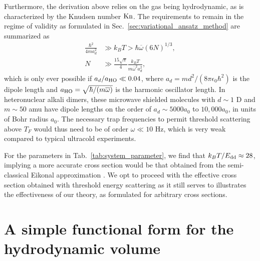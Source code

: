 \documentclass[reprint, amsmath, amssymb, aps, superscriptaddress]{revtex4-1}
\begin{document}
Furthermore, the derivation above relies on the gas being hydrodynamic, as is characterized by the Knudsen number ${\rm Kn}$.  
The requirements to remain in the regime of validity as formulated in Sec.~\ref{sec:variational_ansatz_method} are summarized as  
\begin{subequations} \label{eq:threshold_requirements}
\begin{align}
    \frac{ \hbar^2 }{ 4 m a_d^2 }
    & \gg 
    k_B T
    > 
    \hbar \overline{\omega} ( 6 N )^{1/3}, \\ 
    N 
    &\gg
    \frac{ 15 \sqrt{ \pi } }{ 4 } \frac{ k_B T }{ m \overline{\omega}^2 a_d^2 }, 
\end{align}
\end{subequations}
which is only ever possible if $a_d / a_{\rm HO} \ll 0.04$,
where $a_d = m d^2 / (8 \pi \epsilon_0 \hbar^2)$ is the dipole length and $a_{\rm HO} = \sqrt{ \hbar / ( m \overline{\omega} ) }$ is the harmonic oscillator length. In heteronuclear alkali dimers, these microwave shielded molecules with $d \sim 1$ D and $m \sim 50$ amu have dipole lengths on the order of $a_{d} \sim 5000 a_0$ to $10,000 a_0$, in units of Bohr radius $a_0$. The necessary trap frequencies to permit threshold scattering above $T_F$ would thus need to be of order $\omega \ll 10$ Hz, which is very weak compared to typical ultracold experiments.  
 
For the parameters in Tab.~\ref{tab:system_parameter}, we find that $k_B T / E_{\rm dd} \approx 28$, implying a more accurate cross section would be that obtained from the semi-classical Eikonal approximation \cite{Glauber55_PR, Glauber59_I, Bohn09_NJP}. We opt to proceed with the effective cross section obtained with threshold energy scattering as it still serves to illustrates the effectiveness of our theory, as formulated for arbitrary cross sections. 

 


\section{ A simple functional form for the hydrodynamic volume \label{app:HD_volume_ansatz} }
\end{document}
